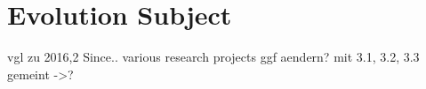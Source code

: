 \section{Evolution Subject}
vgl zu 2016,2 Since.. various research projects ggf aendern?
mit 3.1, 3.2, 3.3 gemeint ->?